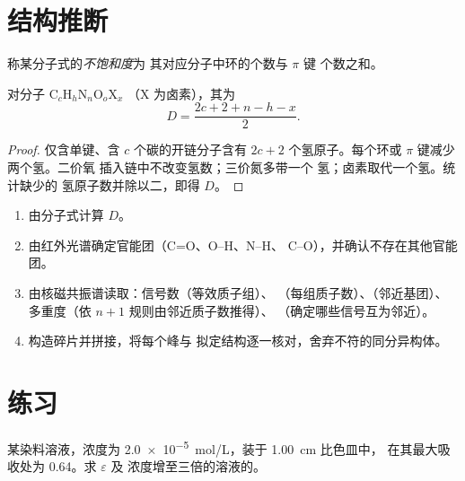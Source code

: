 \section{结构推断}

\begin{definition}[不饱和度]\label{def:b1:structure-spectroscopy:unsaturation}
称某分子式的\emph{不饱和度}为
其对应分子中环的个数与 $\pi$ 键
个数之和。
\end{definition}

\begin{proposition}[由分子式求不饱和度]\label{prop:b1:structure-spectroscopy:unsaturation-formula}
对分子 $\mathrm{C}_c\mathrm{H}_h\mathrm{N}_n\mathrm{O}_o\mathrm{X}_x$
（X 为卤素），其为
\[
  D = \frac{2c + 2 + n - h - x}{2} .
\]
\end{proposition}

\begin{proof}
仅含单键、含 $c$ 个碳的开链分子含有 $2c + 2$
个氢原子。每个环或 $\pi$ 键减少两个氢。二价氧
插入链中不改变氢数；三价氮多带一个
氢；卤素取代一个氢。统计缺少的
氢原子数并除以二，即得 $D$。
\end{proof}

\begin{method}[结构推断]\label{met:b1:structure-spectroscopy:solve-structure}
\begin{enumerate}
  \item 由分子式计算 $D$。
  \item 由红外光谱确定官能团（C=O、O--H、N--H、
        C--O），并确认不存在其他官能团。
  \item 由核磁共振谱读取：信号数（等效质子组）、
        （每组质子数）、（邻近基团）、
        多重度（依 $n + 1$ 规则由邻近质子数推得）、
        （确定哪些信号互为邻近）。
  \item 构造碎片并拼接，将每个峰与
        拟定结构逐一核对，舍弃不符的同分异构体。
\end{enumerate}
\end{method}

\section{练习}

\begin{exercise}[$\star$]\label{exo:b1:structure-spectroscopy:1}
某染料溶液，浓度为 \qty{2.0e-5}{mol/L}，装于 \qty{1.00}{cm} 比色皿中，
在其最大吸收处为 0.64。求 $\varepsilon$ 及
浓度增至三倍的溶液的。
\end{exercise}

